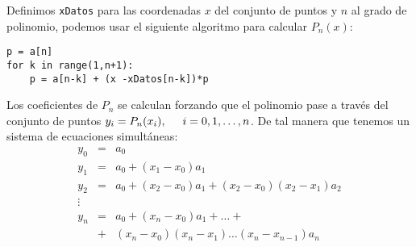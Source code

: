 \begin{frame}[fragile]
Definimos \texttt{xDatos} para las coordenadas $x$ del conjunto de puntos y $n$ al grado de polinomio, podemos usar el siguiente algoritmo para calcular $P_{n}(x)$:
\begin{lstlisting}
p = a[n]
for k in range(1,n+1):
    p = a[n-k] + (x -xDatos[n-k])*p
\end{lstlisting}
\end{frame}
\begin{frame}
Los coeficientes de $P_{n}$ se calculan forzando que el polinomio pase a través del conjunto de puntos $y_{i}=P_{n}(x_{i}),\hspace{0.5cm} i =0,1,\ldots,n$. De tal manera que tenemos un sistema de ecuaciones simultáneas:
\begin{eqnarray*}
y_{0} &=& a_{0} \\
y_{1} &=& a_{0} + (x_{1}-x_{0})a_{1} \\
y_{2} &=& a_{0} + (x_{2}-x_{0})a_{1} + (x_{2}-x_{0})(x_{2}-x_{1})a_{2} \\
\vdots \\
y_{n} &=& a_{0} + (x_{n}-x_{0})a_{1} + \ldots + \\
       &+& (x_{n}-x_{0})(x_{n}-x_{1})\ldots(x_{n}-x_{n-1})a_{n}
\end{eqnarray*}
\end{frame}
